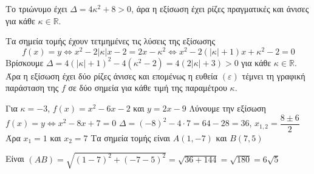 
\begin{alist}
\item Το τριώνυμο έχει $\Delta = 4\kappa^2 + 8 > 0$, άρα η εξίσωση έχει ρίζες πραγματικές και άνισες για κάθε $\kappa \in \mathbb{R}$.

\item Τα σημεία τομής έχουν τετμημένες τις λύσεις της εξίσωσης
\[f(x) = y \Leftrightarrow x^2 - 2|\kappa|x - 2 = 2x - \kappa^2 \Leftrightarrow x^2 - 2(|\kappa| + 1)x + \kappa^2 - 2 = 0\]
Βρίσκουμε $\Delta = 4(|\kappa| + 1)^2 - 4(\kappa^2 - 2) = 4(2|\kappa| + 3) > 0$ για κάθε $\kappa \in \mathbb{R}$. Άρα η εξίσωση έχει δύο ρίζες άνισες και επομένως η ευθεία $(\varepsilon)$ τέμνει τη γραφική παράσταση της $f$ σε δύο σημεία για κάθε τιμή της παραμέτρου $\kappa$.

\item Για $\kappa = -3$,
$f(x) = x^2 - 6x - 2$ και $y = 2x - 9$
Λύνουμε την εξίσωση $f(x) = y \Leftrightarrow x^2 - 8x + 7 = 0$
$\Delta = (-8)^2 - 4 \cdot 7 = 64 - 28 = 36$, $x_{1,2} = \dfrac{8 \pm 6}{2}$
Άρα $x_1 = 1$ και $x_2 = 7$
Τα σημεία τομής είναι $A(1,-7)$ και $B(7, 5)$

\item Είναι $(AB) = \sqrt{(1 - 7)^2 + (-7 - 5)^2} = \sqrt{36 + 144} = \sqrt{180} = 6\sqrt{5}$
\end{alist}

